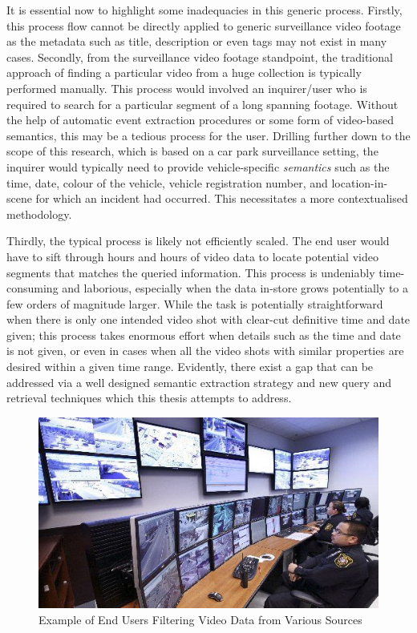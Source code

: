 It is essential now to highlight some inadequacies in this generic process. Firstly, this process flow cannot be directly applied to generic surveillance video footage as the metadata such as title, description or even tags may not exist in many cases.
Secondly, from the surveillance video footage standpoint, the traditional approach of finding a particular video from a huge collection is typically performed manually. This process would involved an inquirer/user who is required to search for a particular segment of a long spanning footage. Without the help of automatic event extraction procedures or some form of video-based semantics, this may be a tedious process for the user. 
Drilling further down to the scope of this research, which is based on a car park surveillance setting, the inquirer would typically need to provide vehicle-specific \textit{semantics} such as the time, date, colour of the vehicle, vehicle registration number, and location-in-scene for which an incident had occurred. This necessitates a more contextualised methodology. %

Thirdly, the typical process is likely not efficiently scaled. The end user would have to sift through hours and hours of video data to locate potential video segments that matches the queried information. This %
process is undeniably time-consuming and laborious, especially when the data in-store grows potentially to a few orders of magnitude larger. While the task is potentially straightforward when there is only one intended video shot with clear-cut definitive time and date given; this process takes enormous effort when details such as the time and date is not given, or even in cases when all the video shots with similar properties are desired within a given time range. Evidently, there exist a gap that can be addressed 
via a well designed semantic extraction strategy and new query and retrieval techniques which this thesis attempts to address.

\begin{figure}[!hbt]\centering
\includegraphics[width=\textwidth]{image/screenshots/observer.jpg}
\caption{Example of End Users Filtering Video Data from Various Sources}
\label{fig:observerdatacenter}
\end{figure}

